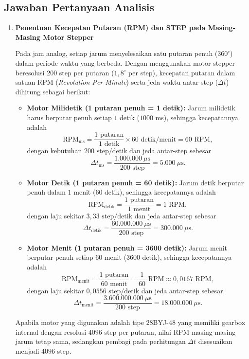 \subsection{Jawaban Pertanyaan Analisis}

\begin{enumerate}
    \item \textbf{Penentuan Kecepatan Putaran (RPM) dan STEP pada Masing-Masing Motor Stepper}

    Pada jam analog, setiap jarum menyelesaikan satu putaran penuh ($360^\circ$) dalam periode waktu yang berbeda. Dengan menggunakan motor stepper beresolusi $200$ step per putaran ($1,8^\circ$ per step), kecepatan putaran dalam satuan RPM (\textit{Revolution Per Minute}) serta jeda waktu antar-step ($\Delta t$) dihitung sebagai berikut:
    \begin{itemize}
        \item \textbf{Motor Milidetik (1 putaran penuh = 1 detik):} Jarum milidetik harus berputar penuh setiap $1$ detik ($1000$ ms), sehingga kecepatannya adalah
        \[
        \text{RPM}_{\text{ms}} = \frac{1\text{ putaran}}{1\text{ detik}} \times 60\text{ detik/menit} = 60\text{ RPM},
        \]
        dengan kebutuhan $200\text{ step/detik}$ dan jeda antar-step sebesar
        \[
        \Delta t_{\text{ms}} = \frac{1.000.000\ \mu\text{s}}{200\text{ step}} = 5.000\ \mu\text{s}.
        \]

        \item \textbf{Motor Detik (1 putaran penuh = 60 detik):} Jarum detik berputar penuh dalam $1$ menit ($60$ detik), sehingga kecepatannya adalah
        \[
        \text{RPM}_{\text{detik}} = \frac{1\text{ putaran}}{1\text{ menit}} = 1\text{ RPM},
        \]
        dengan laju sekitar $3,33\text{ step/detik}$ dan jeda antar-step sebesar
        \[
        \Delta t_{\text{detik}} = \frac{60.000.000\ \mu\text{s}}{200\text{ step}} = 300.000\ \mu\text{s}.
        \]

        \item \textbf{Motor Menit (1 putaran penuh = 3600 detik):} Jarum menit berputar penuh setiap $60$ menit ($3600$ detik), sehingga kecepatannya adalah
        \[
        \text{RPM}_{\text{menit}} = \frac{1\text{ putaran}}{60\text{ menit}} = \frac{1}{60}\text{ RPM} \approx 0,0167\text{ RPM},
        \]
        dengan laju sekitar $0,0556\text{ step/detik}$ dan jeda antar-step sebesar
        \[
        \Delta t_{\text{menit}} = \frac{3.600.000.000\ \mu\text{s}}{200\text{ step}} = 18.000.000\ \mu\text{s}.
        \]
    \end{itemize}
    Apabila motor yang digunakan adalah tipe 28BYJ-48 yang memiliki gearbox internal dengan resolusi $4096$ step per putaran, nilai RPM masing-masing jarum tetap sama, sedangkan pembagi pada perhitungan $\Delta t$ disesuaikan menjadi $4096$ step.


\end{enumerate}
